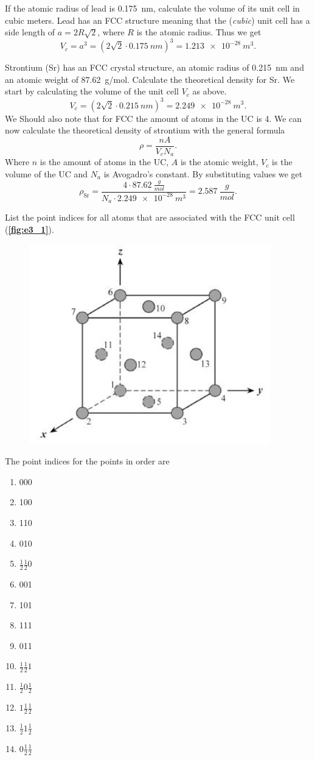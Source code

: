 
If the atomic radius of lead is \qty{0,175}{nm}, calculate the volume of its unit cell in cubic meters.
\bigbreak
Lead has an FCC structure meaning that the (\textit{cubic}) unit cell has a side length of $a = 2R \sqrt{2}$, where $R$ is the atomic radius. Thus we get
\[ 
V_c = a^3 = \left( 2\sqrt{2} \cdot \qty{0,175}{nm}  \right)^3 = \qty{1,213e-28}{m^3} 
.\]


Strontium (Sr) has an FCC crystal structure, an atomic radius of \qty{0,215}{nm} and an atomic weight of \qty{87,62}{g/mol}. Calculate the theoretical density for Sr.
\bigbreak
We start by calculating the volume of the unit cell $V_c$ as above.
\[ 
V_c = \left( 2 \sqrt{2} \cdot \qty{0,215}{nm}  \right)^3 = \qty{2,249e-28}{m^3} 
.\]
We Should also note that for FCC the amount of atoms in the UC is 4. We can now calculate the theoretical density of strontium with the general formula
\[ 
\rho = \frac{nA}{V_c N_a}
.\]
Where $n$ is the amount of atoms in the UC, $A$ is the atomic weight, $V_c$ is the volume of the UC and $N_a$ is Avogadro's constant. By substituting values we get
\[ 
\rho_{\mathrm{Sr}} = \frac{4 \cdot \qty{87,62}{\frac{g}{mol}}}{N_a \cdot \qty{2,249e-28}{m^3}} = \qty{2,587}{\frac{g}{mol}} 
.\]


List the point indices for all atoms that are associated with the FCC unit cell (\textbf{\autoref{fig:e3_1}}).
\begin{figure} [ht]
  \centering
  \caption{}
  \includegraphics[width=0.5\linewidth]{../figures/e3_1.png}
  \label{fig:e3_1}
\end{figure}
\bigbreak
The point indices for the points in order are
\begin{enumerate}
  \item 000
  \item 100
  \item 110
  \item 010
  \item $\frac{1}{2}\frac{1}{2}0$
  \item 001
  \item 101
  \item 111
  \item 011
  \item $\frac{1}{2}\frac{1}{2}1$
  \item $\frac{1}{2}0\frac{1}{2}$
  \item $1 \frac{1}{2} \frac{1}{2}$
  \item $\frac{1}{2}1 \frac{1}{2}$
  \item $0 \frac{1}{2} \frac{1}{2}$
\end{enumerate}

